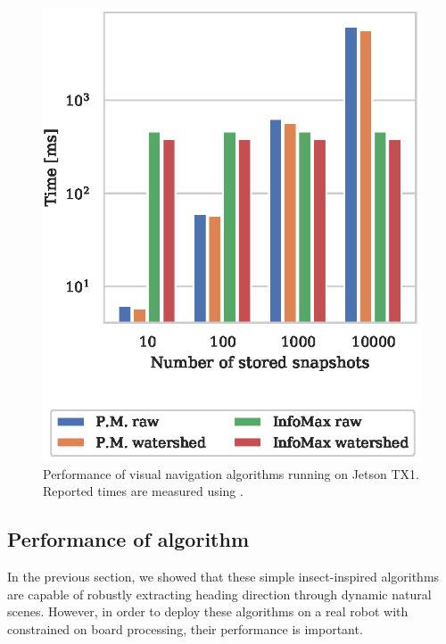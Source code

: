 \documentclass[letterpaper]{article}
\begin{document}
\begin{figure}[t]
    \centering
    \includegraphics{figures/jetson_test_performance.eps}
    \caption{Performance of visual navigation algorithms running on Jetson TX1. Reported times are measured using .}
    \label{fig:jetson_test_performance}
\end{figure}

\subsection{Performance of algorithm}
In the previous section, we showed that these simple insect-inspired algorithms are capable of robustly extracting heading direction through dynamic natural scenes. 
However, in order to deploy these algorithms on a real robot with constrained on board processing, their performance is important. 
\end{document}
